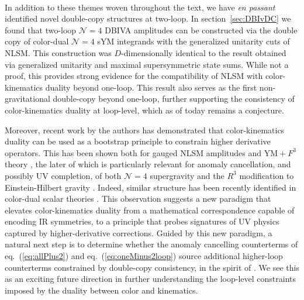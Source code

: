\documentclass[11pt,letter]{article}
\def\sect#1{section~\ref{#1}}
\def\eqn#1{eq.~(\ref{#1})}
\begin{document}
\paragraph{} In addition to these themes woven throughout the text, we have \textit{en passant} identified novel double-copy structures at two-loop. In \sect{sec:DBIvDC} we found that two-loop $\mathcal{N}=4$ DBIVA amplitudes can be constructed via the double copy of color-dual $\mathcal{N}=4$ sYM integrands with the generalized unitarity cuts of NLSM. This construction was $D$-dimensionally identical to the result obtained via generalized unitarity and maximal supersymmetric state sums. While not a proof, this provides strong evidence for the compatibility of NLSM with color-kinematics duality beyond one-loop. This result also serves as the first non-gravitational double-copy beyond one-loop, further supporting the consistency of color-kinematics duality at loop-level, which as of today remains a conjecture. 


Moreover, recent work by the authors has demonstrated that color-kinematics duality can be used as a bootstrap principle to constrain higher derivative operators. This has been shown both for gauged NLSM amplitudes \cite{Carrasco:2022sck} and $\text{YM}+F^3$ theory \cite{Carrasco:2022lbm}, the later of which is particularly relevant for anomaly cancellation, and possibly UV completion, of both $\mathcal{N}=4$ supergravity and the $R^3$ modification to Einstein-Hilbert gravity \cite{Carrasco:2022lbm}. Indeed, similar structure has been recently identified in color-dual scalar theories \cite{Chen:2022shl,Chen:2023dcx,Brown:2023srz}. This observation suggests a new paradigm that elevates color-kinematics duality from a mathematical correspondence capable of encoding IR symmetries, to a principle that probes signatures of UV physics captured by higher-derivative corrections. 
Guided by this new paradigm, a natural next step is to determine whether the anomaly cancelling counterterms of \eqn{eq:allPlus2} and \eqn{eq:oneMinus2loop} source additional higher-loop counterterms constrained by double-copy consistency, in the spirit of \cite{Carrasco:2022lbm}. 
We see this as an exciting future direction in further understanding the loop-level constraints imposed by the duality between color and kinematics.  
\end{document}
